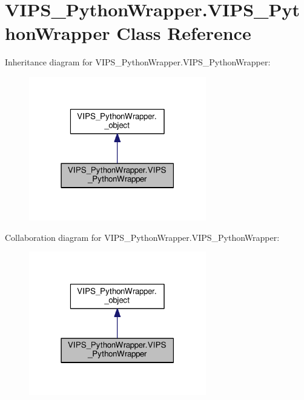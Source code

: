 \hypertarget{classVIPS__PythonWrapper_1_1VIPS__PythonWrapper}{}\section{V\+I\+P\+S\+\_\+\+Python\+Wrapper.\+V\+I\+P\+S\+\_\+\+Python\+Wrapper Class Reference}
\label{classVIPS__PythonWrapper_1_1VIPS__PythonWrapper}


Inheritance diagram for V\+I\+P\+S\+\_\+\+Python\+Wrapper.\+V\+I\+P\+S\+\_\+\+Python\+Wrapper\+:
\nopagebreak
\begin{figure}[H]
\begin{center}
\leavevmode
\includegraphics[width=219pt]{classVIPS__PythonWrapper_1_1VIPS__PythonWrapper__inherit__graph}
\end{center}
\end{figure}


Collaboration diagram for V\+I\+P\+S\+\_\+\+Python\+Wrapper.\+V\+I\+P\+S\+\_\+\+Python\+Wrapper\+:
\nopagebreak
\begin{figure}[H]
\begin{center}
\leavevmode
\includegraphics[width=219pt]{classVIPS__PythonWrapper_1_1VIPS__PythonWrapper__coll__graph}
\end{center}
\end{figure}
